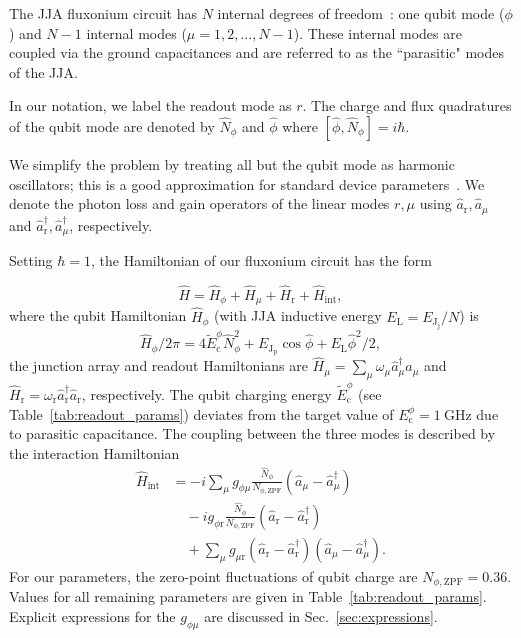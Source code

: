 \documentclass[%
reprint,
superscriptaddress,
 amsmath,amssymb,
 aps,
 prx,
longbibliography,
floatfix,
]{revtex4-2}
\begin{document}
The JJA fluxonium circuit has $N$ internal degrees of freedom~\cite{ferguson2013symmetries,viola2015collective}: one qubit mode ($\phi$) and $N-1$ internal modes ($\mu=1,2,...,N-1$). These internal modes are coupled via the ground capacitances and are referred to as the ``parasitic" modes of the JJA. 

In our notation, we label the readout mode as $r$. The charge and flux quadratures of the qubit mode are denoted by $\hat N_\phi$ and $\hat \phi$ where $[\hat \phi,\hat N_\phi]=i\hbar$. 

We simplify the problem by treating all but the qubit mode as harmonic oscillators; this is a good approximation for standard device parameters~\cite{ferguson2013symmetries,viola2015collective,dumas2024unified}. We denote the photon loss and gain operators of the linear modes $r,\mu$ using $\hat a_\textrm{r},\hat a_\mu$ and $\hat a_\textrm{r}^\dagger,\hat a_\mu^\dagger$, respectively. 

Setting $\hbar=1$, the Hamiltonian of our fluxonium circuit has the form~\cite{viola2015collective}

\begin{equation}
   \hat H =\hat{H}_\phi + \hat{H}_\mu + \hat{H}_\textrm{r} + \hat{H}_{\textrm{int}},\label{Hamiltonian_total}
\end{equation}
where the qubit Hamiltonian $\hat{H}_\phi$ (with JJA inductive energy $E_\textrm{L}=E_{\textrm{J}_\textrm{j}}/N$) is 
\begin{equation}
\hat{H}_\phi / 2\pi = 4\tilde{E}^\phi_\textrm{c} \hat N_\phi^2+ E_{\textrm{J}_\textrm{p}}\cos{\hat\phi}+E_\textrm{L}\hat \phi^2 /2,\label{eq:Hphi}
\end{equation}
the junction array and readout Hamiltonians are $\hat{H}_\mu = \sum_{\mu}\omega_\mu \hat a_\mu^\dagger \hat a_\mu$ and $\hat{H}_\textrm{r} = \omega_\textrm{r} \hat a_\textrm{r}^\dagger \hat a_\textrm{r}$, respectively. The qubit charging energy
$\tilde{E}^\phi_\textrm{c}$ (see Table~\ref{tab:readout_params}) deviates from the target value of $E_{\textrm{c}}^{\phi}=1 \ \mathrm{GHz}$ due to parasitic capacitance. The coupling between the three modes is described by the interaction Hamiltonian
\begin{align}\label{eq:int_hamiltonian}
\hat{H}_{\textrm{int}} &= -i\sum_{\mu} g_{\phi\mu} \frac{\hat N_\phi}{{N_{\phi,\mathrm{ZPF}}}} (\hat a_\mu-\hat a_\mu^\dagger)\nonumber \\ &\quad-ig_{\phi \textrm{r}} \frac{\hat N_\phi}{{N_{\phi,\mathrm{ZPF}}}} (\hat a_\textrm{r}-\hat a_\textrm{r}^\dagger) \nonumber \\&\quad+ \sum_{\mu} g_{\mu \textrm{r}} (\hat a_\textrm{r}-\hat a_\textrm{r}^\dagger)(\hat a_\mu-\hat a_\mu^\dagger).
\end{align}
For our parameters, the zero-point fluctuations of qubit charge are $N_{\phi,\mathrm{ZPF}}=0.36$. Values for all remaining parameters are given in Table~\ref{tab:readout_params}. Explicit expressions for the $g_{\phi\mu}$ are discussed in Sec.~\ref{sec:expressions}.
 
\end{document}
